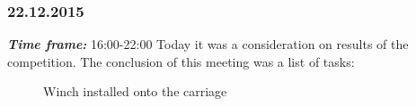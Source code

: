 \subsubsection{22.12.2015}
\textit{\textbf{Time frame:}} 16:00-22:00 \newline
Today it was a consideration on results of the competition. The conclusion of this meeting was a list of tasks:

\begin{figure}[H]
	\begin{minipage}[h]{0.58\linewidth}
		\caption{Winch installed onto the carriage}
	\end{minipage}
	\hfill
	\begin{minipage}[h]{0.37\linewidth}

\end{minipage}
\end{figure}
